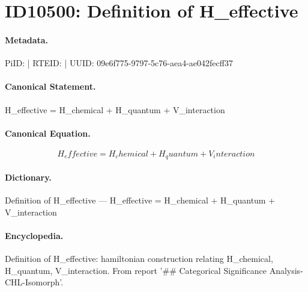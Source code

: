 \section*{ID10500: Definition of H\_effective}
\paragraph{Metadata.}
PiID:  | RTEID:  | UUID: 09e6f775-9797-5c76-aea4-ae042fecff37

\paragraph{Canonical Statement.}
H\_effective = H\_chemical + H\_quantum + V\_interaction

\paragraph{Canonical Equation.}
\[
H_effective = H_chemical + H_quantum + V_interaction
\]

\paragraph{Dictionary.}
Definition of H\_effective — H\_effective = H\_chemical + H\_quantum + V\_interaction

\paragraph{Encyclopedia.}
Definition of H\_effective: hamiltonian construction relating H\_chemical, H\_quantum, V\_interaction. From report '\#\# Categorical Significance Analysis- CHL-Isomorph'.
